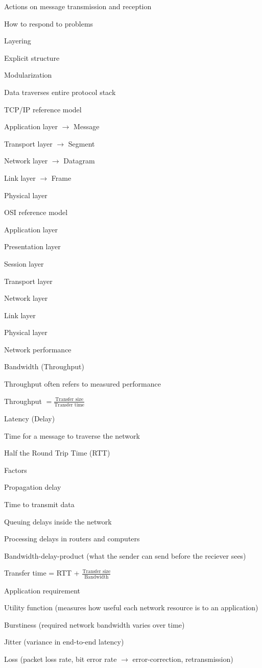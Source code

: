 		\item Actions on message transmission and reception
		\item How to respond to problems
	\enumend
	\item Layering
	\enumstart
		\item Explicit structure
		\item Modularization
		\item Data traverses entire protocol stack
	\enumend
	\item TCP/IP reference model
	\enumstart
		\item Application layer $\rightarrow$ Message
		\item Transport layer $\rightarrow$ Segment
		\item Network layer $\rightarrow$ Datagram
		\item Link layer $\rightarrow$ Frame
		\item Physical layer
	\enumend
	\item OSI reference model
	\enumstart
		\item Application layer
		\item Presentation layer
		\item Session layer
		\item Transport layer
		\item Network layer
		\item Link layer
		\item Physical layer
	\enumend
	\item Network performance
	\enumstart
		\item Bandwidth (Throughput)
		\enumstart
			\item Throughput often refers to measured performance
			\item Throughput $= \frac{\text{Transfer size}}{\text{Transfer time}}$
		\enumend
		\item Latency (Delay)
		\enumstart
			\item Time for a message to traverse the network
			\item Half the Round Trip Time (RTT)
			\item Factors
			\enumstart
				\item Propagation delay
				\item Time to transmit data
				\item Queuing delays inside the network
				\item Processing delays in routers and computers
			\enumend
		\enumend
		\item Bandwidth-delay-product (what the sender can send before the reciever sees)
		\item Transfer time = RTT + $\frac{\text{Transfer size}}{\text{Bandwidth}}$
		\item Application requirement
		\enumstart
			\item Utility function (measures how useful each network resource is to an application)
			\item Burstiness (required network bandwidth varies over time)
			\item Jitter (variance in end-to-end latency)
			\item Loss (packet loss rate, bit error rate $\rightarrow$ error-correction, retransmission)
		\enumend
	\enumend
\enumend
